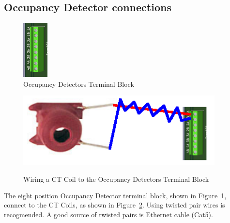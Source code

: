 \subsection{Occupancy Detector connections}
\begin{figure}[hbpt]\begin{centering}%
\includegraphics{ESP32-S3-MultiFunctionOccupancyDetectorsTermBlock.png}
\caption{Occupancy Detectors Terminal Block}
\label{fig:ESP32-S3-MultiFunctionOccupancyDetectorsTermBlock}
\end{centering}\end{figure} 
\begin{figure}[hbpt]\begin{centering}%
\includegraphics[height=1.5in]{ESP32-S3-MultiFunctionOccupancyDetectorsCTCoilWiring.png}
\label{fig:ESP32-S3-MultiFunctionOccupancyDetectorsCTCoilWiring}
\caption{Wiring a CT Coil to the Occupancy Detectors Terminal Block}
\end{centering}\end{figure}

The eight position Occupancy Detector terminal block, shown in 
Figure~\ref{fig:ESP32-S3-MultiFunctionOccupancyDetectorsTermBlock}, connect to 
the CT Coils, as shown in 
Figure~\ref{fig:ESP32-S3-MultiFunctionOccupancyDetectorsCTCoilWiring}.  Using 
twisted pair wires is recogmended.  A good source of twisted pairs is Ethernet 
cable (Cat5).



